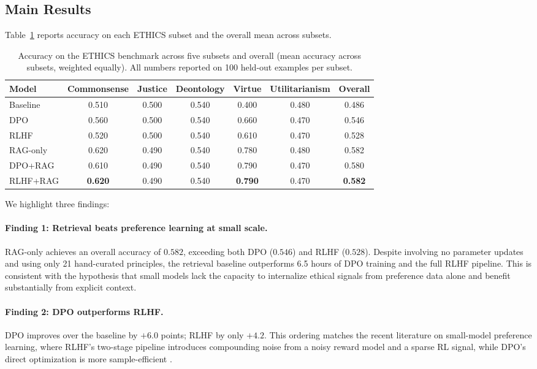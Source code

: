 \subsection{Main Results}
Table~\ref{tab:main} reports accuracy on each ETHICS subset and the overall mean across subsets.

\begin{table}[t]
\centering
\small
\begin{tabular}{l|ccccc|c}
\toprule
\textbf{Model} & \textbf{Commonsense} & \textbf{Justice} & \textbf{Deontology} & \textbf{Virtue} & \textbf{Utilitarianism} & \textbf{Overall} \\
\midrule
Baseline    & 0.510 & 0.500 & 0.540 & 0.400 & 0.480 & 0.486 \\
DPO         & 0.560 & 0.500 & 0.540 & 0.660 & 0.470 & 0.546 \\
RLHF        & 0.520 & 0.500 & 0.540 & 0.610 & 0.470 & 0.528 \\
\midrule
RAG-only    & 0.620 & 0.490 & 0.540 & 0.780 & 0.480 & 0.582 \\
DPO+RAG     & 0.610 & 0.490 & 0.540 & 0.790 & 0.470 & 0.580 \\
RLHF+RAG    & \textbf{0.620} & 0.490 & 0.540 & \textbf{0.790} & 0.470 & \textbf{0.582} \\
\bottomrule
\end{tabular}
\caption{Accuracy on the ETHICS benchmark across five subsets and overall (mean accuracy across subsets, weighted equally). All numbers reported on 100 held-out examples per subset.}
\label{tab:main}
\end{table}

We highlight three findings:

\paragraph{Finding 1: Retrieval beats preference learning at small scale.}
RAG-only achieves an overall accuracy of $0.582$, exceeding both DPO ($0.546$) and RLHF ($0.528$). Despite involving no parameter updates and using only 21 hand-curated principles, the retrieval baseline outperforms 6.5 hours of DPO training and the full RLHF pipeline. This is consistent with the hypothesis that small models lack the capacity to internalize ethical signals from preference data alone and benefit substantially from explicit context.

\paragraph{Finding 2: DPO outperforms RLHF.}
DPO improves over the baseline by $+6.0$ points; RLHF by only $+4.2$. This ordering matches the recent literature on small-model preference learning, where RLHF's two-stage pipeline introduces compounding noise from a noisy reward model and a sparse RL signal, while DPO's direct optimization is more sample-efficient \citep{rafailov2023dpo,xu2024dpo_failures}.

